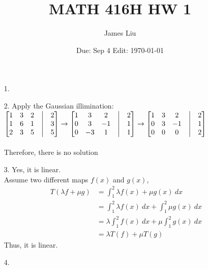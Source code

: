 \documentclass{article}
\date{Due: Sep 4 Edit: \today}
\title{MATH 416H HW 1}
\author{James Liu}
\begin{document}
\maketitle

\begin{itemize}
    \item [1.]
    \item [2.]
    Apply the Gaussian illimination:\\
\(
\begin{bmatrix}
    1&3&2&\bigm|&2\\
    1&6&1&\bigm|&3\\
    2&3&5&\bigm|&5
\end{bmatrix}
\rightarrow
\begin{bmatrix}
    1&3&2&\bigm|&2\\
    0&3&-1&\bigm|&1\\
    0&-3&1&\bigm|&1
\end{bmatrix}
\rightarrow
\begin{bmatrix}
    1&3&2&\bigm|&2\\
    0&3&-1&\bigm|&1\\
    0&0&0&\bigm|&2
\end{bmatrix}
\)
\\ \\
Therefore, there is no solution\\
    \item [3.]
    Yes, it is linear.\\
    Assume two different maps \(f(x)\) and \(g(x)\),
    \begin{align*}
        T(\lambda f+\mu g)  &=\int^2_1 \lambda f(x)+\mu g(x)\ dx\\
                            &=\int^2_1 \lambda f(x)\ dx+\int^2_1 \mu g(x)\ dx\\
                            &=\lambda \int^2_1 f(x)\ dx+ \mu\int^2_1  g(x)\ dx\\
                            &=\lambda T(f)+\mu T(g)
    \end{align*}
    Thus,  it is linear.\\
    \item [4.]
    \item []
\end{itemize}
\end{document}
